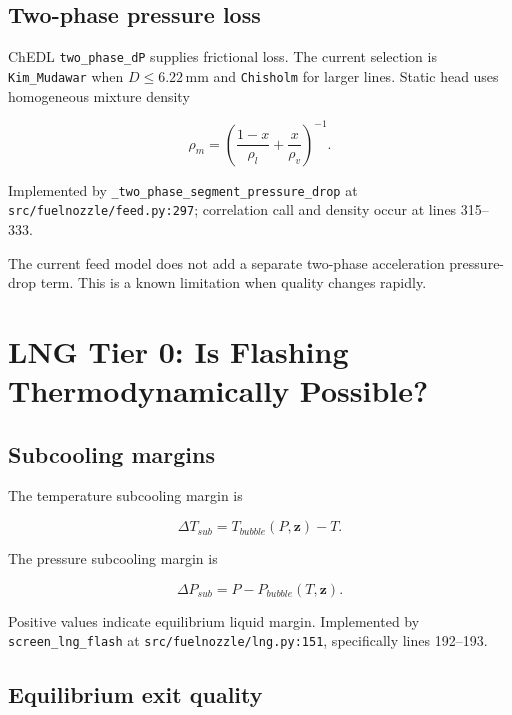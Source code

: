 \documentclass[11pt]{article}
\newcommand{\code}[1]{\nolinkurl{#1}}
\newcommand{\srcline}[2]{\nolinkurl{#1:#2}}
\newcommand{\unit}[1]{\,\mathrm{#1}}
\begin{document}
\subsection{Two-phase pressure loss}

ChEDL \code{two_phase_dP} supplies frictional loss. The current selection is
\code{Kim_Mudawar} when $D\leq 6.22\unit{mm}$ and \code{Chisholm} for larger
lines. Static head uses homogeneous mixture density

\begin{equation}
  \rho_m=\left(\frac{1-x}{\rho_l}+\frac{x}{\rho_v}\right)^{-1}.
  \label{eq:homogeneous-density}
\end{equation}

Implemented by \code{_two_phase_segment_pressure_drop} at
\srcline{src/fuelnozzle/feed.py}{297}; correlation call and density occur at lines
315--333.

The current feed model does not add a separate two-phase acceleration pressure-drop
term. This is a known limitation when quality changes rapidly.

\section{LNG Tier 0: Is Flashing Thermodynamically Possible?}

\subsection{Subcooling margins}

The temperature subcooling margin is

\begin{equation}
  \Delta T_{sub}=T_{bubble}(P,\mathbf z)-T.
  \label{eq:temperature-margin}
\end{equation}

The pressure subcooling margin is

\begin{equation}
  \Delta P_{sub}=P-P_{bubble}(T,\mathbf z).
  \label{eq:pressure-margin}
\end{equation}

Positive values indicate equilibrium liquid margin. Implemented by
\code{screen_lng_flash} at \srcline{src/fuelnozzle/lng.py}{151}, specifically
lines 192--193.

\subsection{Equilibrium exit quality}
\end{document}
